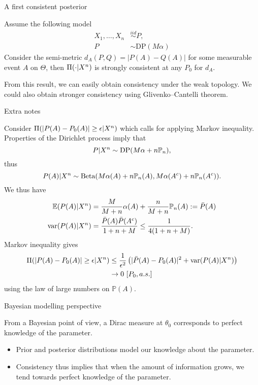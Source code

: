 {A first consistent posterior}

\begin{example}
Assume the following model 
\begin{align*}
X_1, \dots, X_n &\overset{iid}{\sim} P, \\ P &\sim \text{DP}(M\alpha)
\end{align*}
Consider the semi-metric $d_A(P,Q) = |P(A) - Q(A)|$ for some measurable event $A$ on $\Theta$, then $\Pi(\cdot |X^n)$ is \alert{strongly consistent} at any $P_0$ for $d_A$. 
\end{example}
 

From this result, we can easily obtain consistency under the weak topology. We could also obtain stronger consistency using Glivenko--Cantelli theorem. 









{Extra notes}

	Consider $\Pi(|P(A) - P_0(A)| \geq \epsilon | X^n)$ which calls for applying Markov inequality. Properties of the Dirichlet process imply that $$P\vert X^n \sim \text{DP}(M\alpha + n\mathbb{P}_n),$$ thus $$P(A)\vert X^n \sim \text{Beta}(M\alpha(A) + n\mathbb{P}_n(A), M\alpha(A^c) + n\mathbb{P}_n(A^c)).$$ We thus have 
	\begin{align*}
	\mathbb{E}(P(A)|X^n) &= \frac{M}{M+n} \alpha(A) + \frac{n}{M+n} \mathbb{P}_n(A) := \bar{P}(A)\\
    \mathrm{var}(P(A)|X^n) &= \frac{\bar{P}(A)\bar{P}(A^c)}{1 + n + M} \leq \frac{1}{4(1+n+M)}.
	\end{align*}
Markov inequality gives 
	\begin{align*}
	\Pi(|P(A) - P_0(A)| \geq \epsilon | X^n) &\leq \frac{1}{\epsilon^2} \left( |\bar{P}(A) - P_0(A)|^2 +  \mathrm{var}(P(A)|X^n) \right)\\
	 & \to 0 ~ [P_0, a.s. ] 
	\end{align*}
using the law of large numbers on $\mathbb{P}(A)$.






{Bayesian modelling perspective}

From a Bayesian point of view, a \alert{Dirac measure at $\theta_0$} corresponds to perfect knowledge of the parameter. 
\begin{itemize}
	\item Prior and posterior distributions model our knowledge about the parameter.
	\item Consistency thus implies that when the amount of information grows, we tend towards perfect knowledge of the parameter. 
\end{itemize}






